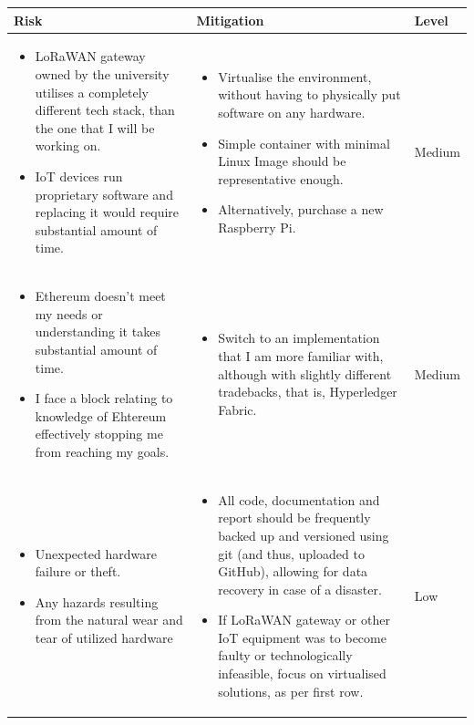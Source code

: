 \documentclass[a4paper,12pt]{article}
\begin{document}
\bgroup
\def\arraystretch{2}
\begin{table}[H]
\centering
\begin{tabular}{|m{}|m{}|m{}|}
\hline
\textbf{Risk} & \textbf{Mitigation}                       & \textbf{Level} \\ \hline
\begin{itemize}[leftmargin=*]
  \item LoRaWAN gateway owned by the university utilises a completely different tech stack, than the one that I will be working on.
  \item IoT devices run proprietary software and replacing it would require substantial amount of time.
\end{itemize} &
\begin{itemize}[leftmargin=*]
  \item Virtualise the environment, without having to physically put software on any hardware.
  \item Simple container with minimal Linux Image should be representative enough.
  \item Alternatively, purchase a new Raspberry Pi.
\end{itemize} &
Medium \\ \hline
\begin{itemize}[leftmargin=*]
  \item Ethereum doesn't meet my needs or understanding it takes substantial amount of time.
  \item I face a block relating to knowledge of Ehtereum effectively stopping me from reaching my goals.
\end{itemize} &
\begin{itemize}[leftmargin=*]
  \item Switch to an implementation that I am more familiar with, although with slightly different tradebacks, that is, Hyperledger Fabric.
\end{itemize} &
Medium \\ \hline
\begin{itemize}[leftmargin=*]
  \item Unexpected hardware failure or theft.
  \item Any hazards resulting from the natural wear and tear of utilized hardware
\end{itemize} &
\begin{itemize}[leftmargin=*]
  \item All code, documentation and report should be frequently backed up and versioned using git (and thus, uploaded to GitHub), allowing for data recovery in case of a disaster.
  \item If LoRaWAN gateway or other IoT equipment was to become faulty or technologically infeasible, focus on virtualised solutions, as per first row.
\end{itemize} &
Low \\ \hline
\end{tabular}
\end{table}
\egroup
\end{document}
